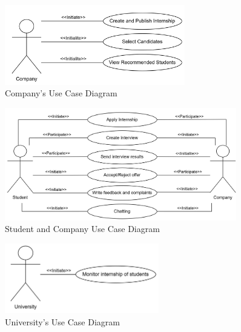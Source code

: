 \begin{figure}[H]
    \centering
    \includegraphics[width=0.7\textwidth]{Images/Use_Case_Diagrams/Company_diagram.png}
    \caption{Company's Use Case Diagram}
\end{figure}
\begin{figure}[H]
    \centering
    \includegraphics[width=0.9\textwidth]{Images/Use_Case_Diagrams/SandC_diagram.png}
    \caption{Student and Company Use Case Diagram}
\end{figure}
\begin{figure}[H]
    \centering
    \includegraphics[width=0.6\textwidth]{Images/Use_Case_Diagrams/University_diagram.png}
    \caption{University's Use Case Diagram}
\end{figure}


